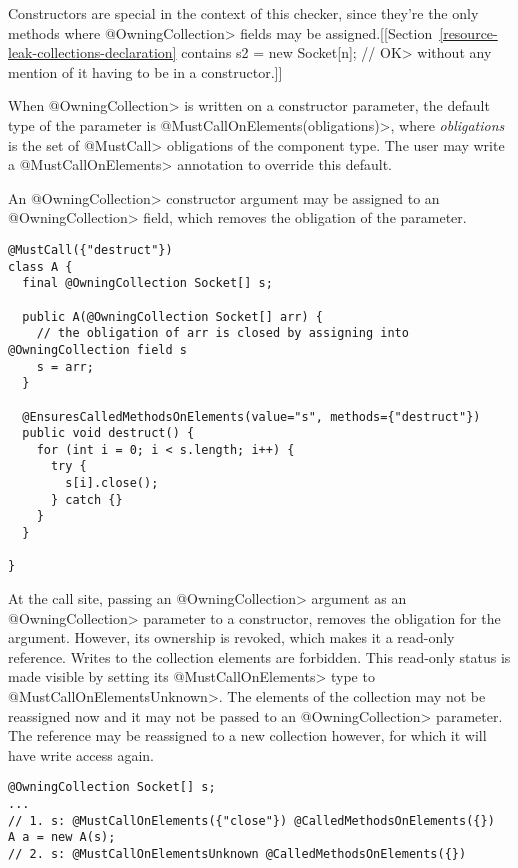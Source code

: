 
Constructors are special in the context of this checker, since they're the
only methods where \<@OwningCollection> fields may be
assigned.[[Section~\ref{resource-leak-collections-declaration} contains
\<s2 = new Socket[n]; // OK> without any mention of it having to be in a constructor.]]

When \<@OwningCollection> is written on a constructor parameter, the
default type of the parameter is \<@MustCallOnElements(obligations)>, where
\textit{obligations} is the set of \<@MustCall> obligations of the
component type. The user may write a \<@MustCallOnElements> annotation to override this default.

An \<@OwningCollection> constructor argument may be assigned to an \<@OwningCollection> field, which removes the obligation of the parameter.

\begin{verbatim}
@MustCall({"destruct"})
class A {
  final @OwningCollection Socket[] s;

  public A(@OwningCollection Socket[] arr) {
    // the obligation of arr is closed by assigning into @OwningCollection field s
    s = arr;
  }

  @EnsuresCalledMethodsOnElements(value="s", methods={"destruct"})
  public void destruct() {
    for (int i = 0; i < s.length; i++) {
      try {
        s[i].close();
      } catch {}
    }
  }

}
\end{verbatim}

At the call site, passing an \<@OwningCollection> argument as an
\<@OwningCollection> parameter to a constructor, removes the obligation for
the argument. However, its ownership is revoked, which makes it a read-only
reference. Writes to the collection elements are forbidden. This read-only
status is made visible by setting its \<@MustCallOnElements> type to
\<@MustCallOnElementsUnknown>. The elements of the collection may not be
reassigned now and it may not be passed to an \<@OwningCollection>
parameter. The reference may be reassigned to a new collection however, for
which it will have write access again.

\begin{verbatim}
@OwningCollection Socket[] s;
...
// 1. s: @MustCallOnElements({"close"}) @CalledMethodsOnElements({})
A a = new A(s);
// 2. s: @MustCallOnElementsUnknown @CalledMethodsOnElements({})
\end{verbatim}


